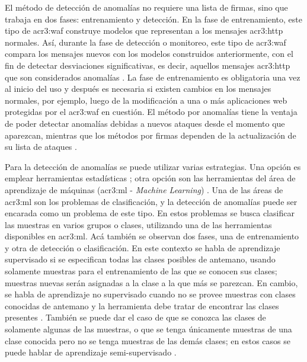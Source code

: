 El método de detección de anomalías no requiere una lista de firmas,
sino que trabaja en dos fases: entrenamiento y detección. En la fase
de entrenamiento, este tipo de \gls{acr3:waf} construye modelos que
representan a los mensajes \gls{acr3:http} normales.
Así, durante la fase de detección o monitoreo, este tipo de \gls{acr3:waf}
compara los mensajes nuevos con los modelos construidos anteriormente,
con el fin de detectar desviaciones significativas, es decir, aquellos
mensajes \gls{acr3:http} que son considerados anomalías
\cite{kruegel2003anomaly}. %
La fase de entrenamiento es obligatoria una vez al inicio del uso y
después es necesaria si existen cambios en los mensajes normales, por
ejemplo, luego de la modificación a una o más aplicaciones web protegidas
por el \gls{acr3:waf} en cuestión.
El método por anomalías tiene la ventaja de poder detectar anomalías
debidas a nuevos ataques desde el momento que aparezcan, mientras que
los métodos por firmas dependen de la actualización de su lista de ataques
\cite{kruegel2003anomaly}. %

Para la detección de anomalías se puede utilizar varias estrategias.
Una opción es emplear herramientas estadísticas
\cite{kruegel2003anomaly} \cite{torranoGimenez2015study};
otra opción son las herramientas del área de aprendizaje de máquinas
(\gls{acr3:ml} - \textit{Machine Learning}) \cite{sommer2010outside}
\cite{buczak2016survey}.
Una de las áreas de \gls{acr3:ml} son los problemas de clasificación,
y la detección de anomalías puede ser encarada como un problema de este
tipo. En estos problemas se busca clasificar las muestras en varios grupos
o clases, utilizando una de las herramientas disponibles en \gls{acr3:ml}.
Acá también se observan dos fases, una de entrenamiento y otra de detección
o clasificación.
En este contexto se habla de aprendizaje supervisado si se especifican
todas las clases posibles de antemano, usando solamente muestras para el
entrenamiento de las que se conocen sus clases; muestras nuevas serán
asignadas a la clase a la que más se parezcan. En cambio, se habla de
aprendizaje no supervisado cuando no se provee muestras con clases conocidas
de antemano y la herramienta debe tratar de encontrar las clases presentes
\cite{torranoGimenez2015study}. %
También se puede dar el caso de que se conozca las clases de solamente
algunas de las muestras, o que se tenga únicamente muestras de una clase
conocida pero no se tenga muestras de las demás clases; en estos casos
se puede hablar de aprendizaje semi-supervisado
\cite{aggarwal2013outlier}. %

